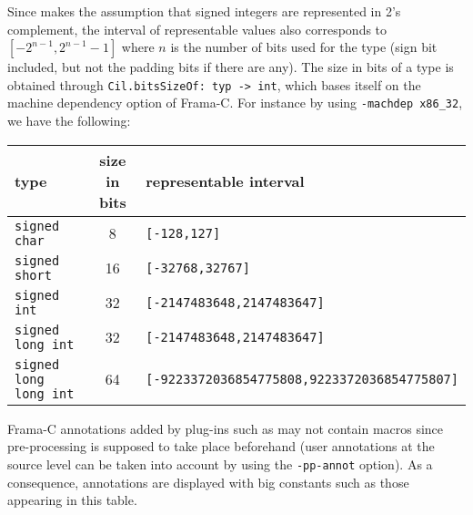 Since \rte{} makes the assumption that signed integers are represented in 2's
complement, the interval of representable values also corresponds to $[-2^{n-1},
  2^{n-1}-1]$ where $n$ is the number of bits used for the type (sign bit
included, but not the padding bits if there are any).  The size in bits of a
type is obtained through \lstinline|Cil.bitsSizeOf: typ -> int|, which bases
itself on the machine dependency option of Frama-C. For instance by using
\lstinline|-machdep x86_32|, we have the following:
\begin{center}
\begin{tabular}{|l|c|l|}
\hline
type & size in bits & representable interval \\
\hline
\lstinline|signed char| & 8 & \lstinline|[-128,127]|  \\
\lstinline|signed short| & 16 & \lstinline|[-32768,32767]| \\
\lstinline|signed int| & 32 & \lstinline|[-2147483648,2147483647]| \\
\lstinline|signed long int| & 32 & \lstinline|[-2147483648,2147483647]| \\
\lstinline|signed long long int| & 64 & \lstinline|[-9223372036854775808,9223372036854775807]| \\
\hline
\end{tabular}
\end{center}


\medskip
Frama-C annotations added by plug-ins such as \rte{} may not contain macros
since pre-processing is supposed to take place beforehand (user annotations at
the source level can be taken into account by using the \lstinline|-pp-annot|
option).  As a consequence, annotations are displayed with big constants such as
those appearing in this table.

